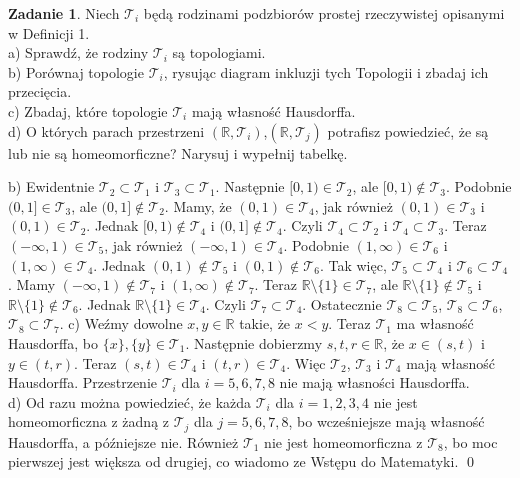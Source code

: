 \documentclass{article}
\theoremstyle{definition}%
\theoremstyle{theorem}
\newtheorem{zad}{Zadanie}
\renewenvironment{proof}{{\bfseries Rozwiązanie \\}}{\qed}
\begin{document}
	\begin{zad}
		Niech $\mathcal{T}_{i}$ będą rodzinami podzbiorów prostej rzeczywistej opisanymi w Definicji 1.\\
		a) Sprawdź, że rodziny $\mathcal{T}_{i}$ są topologiami.\\
		b) Porównaj topologie $\mathcal{T}_{i}$, rysując diagram inkluzji tych Topologii i zbadaj ich przecięcia.\\
		c) Zbadaj, które topologie $\mathcal{T}_{i}$ mają własność Hausdorffa.\\
		d) O których parach przestrzeni $(\mathbb{R},\mathcal{T}_{i})$,$(\mathbb{R},\mathcal{T}_{j})$ potrafisz powiedzieć, że są lub nie są homeomorficzne? Narysuj i wypełnij tabelkę.
	\end{zad}
	\begin{proof}
	b) Ewidentnie $\mathcal{T}_{2}\subset\mathcal{T}_{1}$ i $\mathcal{T}_{3}\subset\mathcal{T}_{1}$. Następnie $[0,1)\in\mathcal{T}_{2}$, ale $[0,1)\not\in\mathcal{T}_{3}$. Podobnie $(0,1]\in\mathcal{T}_{3}$, ale $(0,1]\not\in\mathcal{T}_{2}$. Mamy, że $(0,1)\in\mathcal{T}_{4}$, jak również $(0,1)\in\mathcal{T}_{3}$ i $(0,1)\in\mathcal{T}_{2}$. Jednak $[0,1)\not\in\mathcal{T}_{4}$ i $(0,1]\not\in\mathcal{T}_{4}$. Czyli $\mathcal{T}_{4}\subset\mathcal{T}_{2}$ i $\mathcal{T}_{4}\subset\mathcal{T}_{3}$. Teraz $(-\infty,1)\in\mathcal{T}_{5}$, jak również $(-\infty,1)\in\mathcal{T}_{4}$. Podobnie $(1, \infty)\in\mathcal{T}_{6}$ i $(1, \infty)\in\mathcal{T}_{4}$. Jednak $(0,1)\not\in\mathcal{T}_{5}$ i $(0,1)\not\in\mathcal{T}_{6}$. Tak więc, $\mathcal{T}_{5}\subset\mathcal{T}_{4}$ i $\mathcal{T}_{6}\subset\mathcal{T}_{4}$. Mamy $(-\infty,1)\not\in\mathcal{T}_{7}$ i $(1, \infty)\not\in\mathcal{T}_{7}$. Teraz $\mathbb{R}\setminus\{1\}\in\mathcal{T}_{7}$, ale $\mathbb{R}\setminus\{1\}\not\in\mathcal{T}_{5}$ i $\mathbb{R}\setminus\{1\}\not\in\mathcal{T}_{6}$. Jednak $\mathbb{R}\setminus\{1\}\in\mathcal{T}_{4}$. Czyli $\mathcal{T}_{7}\subset\mathcal{T}_{4}$. Ostatecznie $\mathcal{T}_{8}\subset\mathcal{T}_{5}$, $\mathcal{T}_{8}\subset\mathcal{T}_{6}$,
	$\mathcal{T}_{8}\subset\mathcal{T}_{7}$.
	c) Weźmy dowolne $x,y\in\mathbb{R}$ takie, że $x<y$. Teraz $\mathcal{T}_{1}$ ma własność Hausdorffa, bo $\{x\},\{y\}\in\mathcal{T}_{1}$. Następnie dobierzmy $s,t,r\in\mathbb{R}$, że $x\in(s,t)$ i $y\in(t,r)$. Teraz  $(s,t)\in\mathcal{T}_{4}$ i $(t,r)\in\mathcal{T}_{4}$. Więc $\mathcal{T}_{2}$, $\mathcal{T}_{3}$ i $\mathcal{T}_{4}$ mają własność Hausdorffa.
	Przestrzenie $\mathcal{T}_{i}$ dla $i=5,6,7,8$ nie mają własności Hausdorffa.\\
	d) Od razu można powiedzieć, że każda $\mathcal{T}_{i}$ dla $i=1,2,3,4$ nie jest homeomorficzna z żadną z $\mathcal{T}_{j}$ dla $j=5,6,7,8$, bo wcześniejsze mają własność Hausdorffa, a późniejsze nie. Również $\mathcal{T}_{1}$ nie jest homeomorficzna z $\mathcal{T}_{8}$, bo moc pierwszej jest większa od drugiej, co wiadomo ze Wstępu do Matematyki.
	\end{proof}
	
\end{document}
